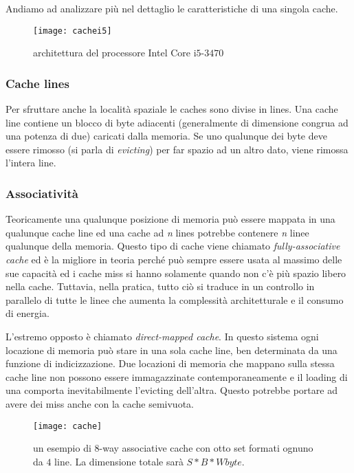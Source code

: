 			Andiamo ad analizzare più nel dettaglio le caratteristiche di una singola cache\cite{ge2016survey,yarom2014flush+}.
			
			\begin{figure}[h]
				\begin{center}
					\texttt{[image: cachei5]}
					\caption{architettura del processore Intel Core i$5$-$3470$}
					\label{fig:cachei5}
				\end{center}
			\end{figure}
			
			\subsubsection{Cache lines}
				Per sfruttare anche la località spaziale le caches sono divise in lines. Una cache line contiene un blocco di byte adiacenti (generalmente di dimensione congrua ad una potenza di due) caricati dalla memoria. Se uno qualunque dei byte deve essere rimosso (si parla di \emph{evicting}) per far spazio ad un altro dato, viene rimossa l'intera line.
				
			\subsubsection{Associatività}
				Teoricamente una qualunque posizione di memoria può essere mappata in una qualunque cache line ed una cache ad \emph{n} lines potrebbe contenere \emph{n} linee qualunque della memoria. Questo tipo di cache viene chiamato \emph{fully-associative cache} ed è la migliore in teoria perché può sempre essere usata al massimo delle sue capacità ed i cache miss si hanno solamente quando non c'è più spazio libero nella cache. Tuttavia, nella pratica, tutto ciò si traduce in un controllo in parallelo di tutte le linee che aumenta la complessità architetturale e il consumo di energia.
				
				L'estremo opposto è chiamato \emph{direct-mapped cache}. In questo sistema ogni locazione di memoria può stare in una sola cache line, ben determinata da una funzione di indicizzazione. Due locazioni di memoria che mappano sulla stessa cache line non possono essere immagazzinate contemporaneamente e il loading di una comporta inevitabilmente l'evicting dell'altra. Questo potrebbe portare ad avere dei miss anche con la cache semivuota.
				
				\begin{figure}
					\begin{center}
						\texttt{[image: cache]}
						\caption[$8$-way associative cache]{un esempio di $8$-way associative cache con otto set formati ognuno da $4$ line. La dimensione totale sarà $S*B*W byte$.}
						\label{fig:cache}
					\end{center}
				\end{figure}
				
